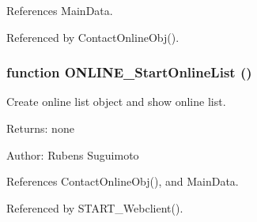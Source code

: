 References MainData.

Referenced by ContactOnlineObj().
\subsubsection[ONLINE\_\-StartOnlineList]{\setlength{\rightskip}{0pt plus 5cm}function ONLINE\_\-StartOnlineList ()}\label{online_8js_2e0b992ddb65508187cab7f7535916dc}


Create online list object and show online list. 

\begin{Desc}
\item[Returns:]none \end{Desc}
\begin{Desc}
\item[Author:]Rubens Suguimoto \end{Desc}


References ContactOnlineObj(), and MainData.

Referenced by START\_\-Webclient().